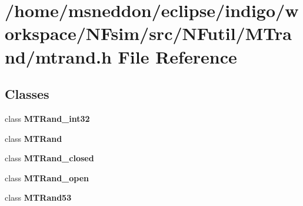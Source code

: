 \section{/home/msneddon/eclipse/indigo/workspace/NFsim/src/NFutil/MTrand/mtrand.h File Reference}
\label{mtrand_8h}


\subsection*{Classes}
\begin{CompactItemize}
\item 
class {\bf MTRand\_\-int32}
\item 
class {\bf MTRand}
\item 
class {\bf MTRand\_\-closed}
\item 
class {\bf MTRand\_\-open}
\item 
class {\bf MTRand53}
\end{CompactItemize}
